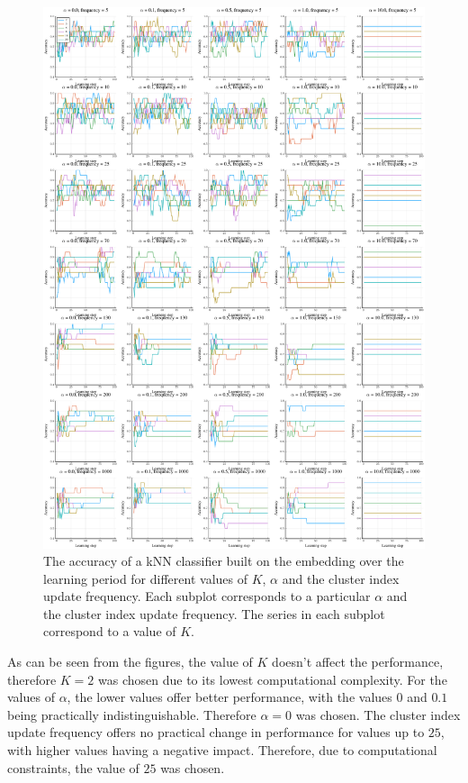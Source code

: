 \begin{figure}[h]
  \centering
  \includegraphics[width=\textwidth]{images/magnet-gridsearch/accuracy/K/magnet-gridsearch-accuracy-K.pdf}
  \caption{The accuracy of a kNN classifier built on the embedding over the learning period for different values of \( K \), \( \alpha \) and the cluster index update frequency. Each subplot corresponds to a particular \( \alpha \) and the cluster index update frequency. The series in each subplot correspond to a value of \( K \).}\label{fig:magnet-gridsearch-ratio}
\end{figure}

As can be seen from the figures, the value of \( K \) doesn't affect the performance, therefore \( K = 2 \) was chosen due to its lowest computational complexity. For the values of \( \alpha \), the lower values offer better performance, with the values \( 0 \) and \( 0.1 \) being practically indistinguishable. Therefore \( \alpha = 0 \) was chosen. The cluster index update frequency offers no practical change in performance for values up to \( 25 \), with higher values having a negative impact. Therefore, due to computational constraints, the value of \( 25 \) was chosen.
